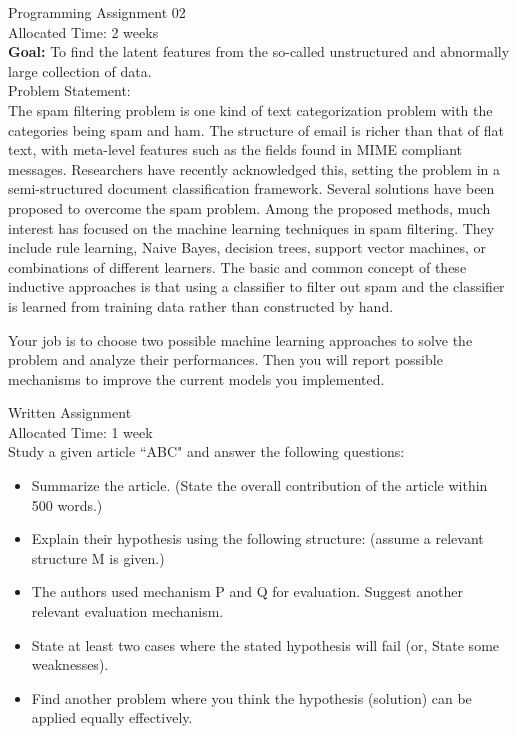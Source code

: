 \documentclass{article}
\begin{document}
\begin{mdframed}[style=MyFrame]
\label{Problem2}
\small
Programming Assignment 02\\
Allocated Time: 2 weeks\\
{\bf Goal:} To find the latent features from the so-called unstructured and abnormally large collection of data.\\
Problem Statement:\\
The spam filtering problem is one kind of text categorization problem with the categories being spam and ham. The structure of email is richer than that of flat text, with meta-level features such as the fields found in MIME compliant messages. Researchers have recently acknowledged this, setting the problem in a semi-structured document classification framework. Several solutions have been proposed to overcome the spam problem. Among the proposed methods, much interest has focused on the machine learning techniques in spam filtering. They include rule learning, Naive Bayes, decision trees, support vector machines, or combinations of different learners. The basic and common concept of these inductive approaches is that using a classifier to filter out spam and the classifier is learned from training data rather than constructed by hand. 
\par Your job is to choose two possible machine learning approaches to solve the problem and analyze their performances. Then you will report possible mechanisms to improve the current models you implemented.
\end{mdframed}
\begin{mdframed}[style=MyFrame]
\label{Problem3}
\small
Written Assignment\\
Allocated Time: 1 week\\
Study a given article ``ABC" and answer the following questions:\\
\begin{itemize}
\item Summarize the article. (State the overall contribution of the article within 500 words.)
\item Explain their hypothesis using the following structure: (assume a relevant structure M is given.)
\item The authors used mechanism P and Q for evaluation. Suggest another relevant evaluation mechanism.
\item State at least two cases where the stated hypothesis will fail (or, State some weaknesses).
\item Find another problem where you think the hypothesis (solution) can be applied equally effectively.
\end{itemize} 
\end{mdframed}
\end{document}
